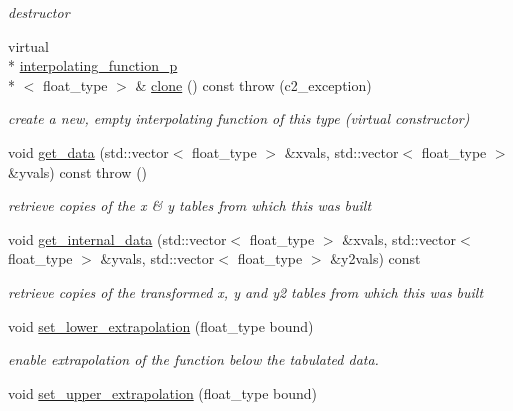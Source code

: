 \begin{DoxyCompactItemize}
\begin{DoxyCompactList}\small\item\em destructor \end{DoxyCompactList}\item 
\hypertarget{classinterpolating__function__p_a8a2c601fde0ef3226e51d1f51b4f5f2f}{virtual \\*
\hyperlink{classinterpolating__function__p}{interpolating\-\_\-function\-\_\-p}\\*
$<$ float\-\_\-type $>$ \& \hyperlink{classinterpolating__function__p_a8a2c601fde0ef3226e51d1f51b4f5f2f}{clone} () const   throw (c2\-\_\-exception)}\label{classinterpolating__function__p_a8a2c601fde0ef3226e51d1f51b4f5f2f}

\begin{DoxyCompactList}\small\item\em create a new, empty interpolating function of this type (virtual constructor) \end{DoxyCompactList}\item 
void \hyperlink{classinterpolating__function__p_a93652fb1b325f38c9a0c0101f6064ee4}{get\-\_\-data} (std\-::vector$<$ float\-\_\-type $>$ \&xvals, std\-::vector$<$ float\-\_\-type $>$ \&yvals) const   throw ()
\begin{DoxyCompactList}\small\item\em retrieve copies of the x \& y tables from which this was built \end{DoxyCompactList}\item 
void \hyperlink{classinterpolating__function__p_aefc83ca152cbefa5fc9278b26b5b2aee}{get\-\_\-internal\-\_\-data} (std\-::vector$<$ float\-\_\-type $>$ \&xvals, std\-::vector$<$ float\-\_\-type $>$ \&yvals, std\-::vector$<$ float\-\_\-type $>$ \&y2vals) const 
\begin{DoxyCompactList}\small\item\em retrieve copies of the transformed x, y and y2 tables from which this was built \end{DoxyCompactList}\item 
void \hyperlink{classinterpolating__function__p_a2c3f8e1552a4d7ff43361baef34d5ae5}{set\-\_\-lower\-\_\-extrapolation} (float\-\_\-type bound)
\begin{DoxyCompactList}\small\item\em enable extrapolation of the function below the tabulated data. \end{DoxyCompactList}\item 
void \hyperlink{classinterpolating__function__p_ad9efb0fd01af689dd8218262891d6ab9}{set\-\_\-upper\-\_\-extrapolation} (float\-\_\-type bound)

\end{DoxyCompactItemize}
